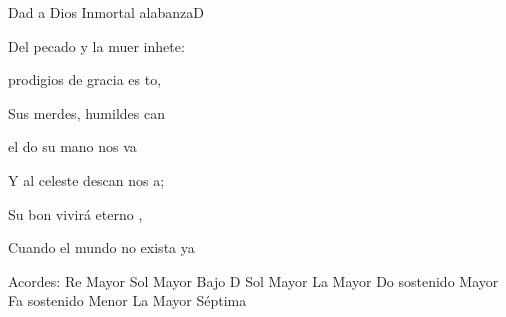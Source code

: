 \documentclass[12pt, spanish]{book}
\begin{document}
\begin{song}{Dad a Dios Inmortal alabanza}{D}
\begin{SBOpGroup}
            Del pecado y la muer inhete:

             prodigios de gracia es to,

            Sus merdes, humildes can

             el do su mano nos va

            Y al celeste descan nos a;

            Su bon vivirá eterno ,

            Cuando el mundo no exista ya 
        \end{SBOpGroup}

        \ifChordBk
        \begin{SBOpGroup}
            Acordes:
            \upchord{\D}\qquad Re Mayor \hfill
            \upchord{\GD}\qquad Sol Mayor Bajo D \hfill\null\break
            \upchord{\G}\qquad Sol Mayor \hfill
            \upchord{\A}\qquad La Mayor \hfill\null\break
            \upchord{\Cs}\qquad Do sostenido Mayor \hfill
            \upchord{\Fsm}\qquad Fa sostenido Menor \hfill\null\break
            \upchord{\Aseven}\qquad La Mayor S\'eptima \hfill
        \end{SBOpGroup}
        \fi
    \end{song}
\end{document}
